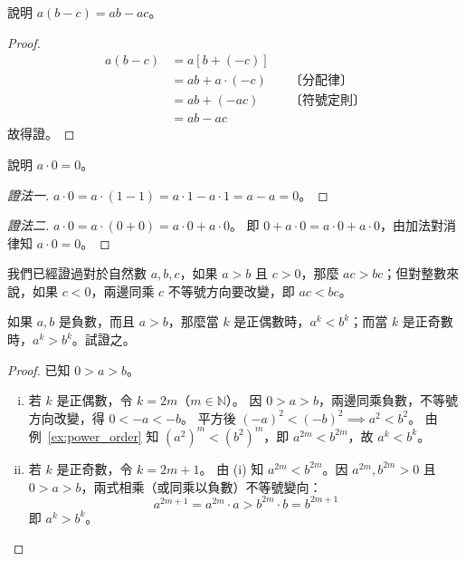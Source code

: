 \begin{example}\label{ex:distrib_minus}
說明 $a(b-c) = ab - ac$。
\end{example}

\begin{proof}
\begin{align*}
  a(b-c) &= a[b + (-c)] \\
  &= ab + a \cdot (-c) && \text{〔分配律〕} \\
  &= ab + (-ac) && \text{〔符號定則〕} \\
  &= ab - ac
\end{align*}
故得證。
\end{proof}

\begin{example}\label{ex:mul_zero_proof}
說明 $a \cdot 0 = 0$。
\end{example}

\begin{proof}[證法一]
$a \cdot 0 = a \cdot (1 - 1) = a \cdot 1 - a \cdot 1 = a - a = 0$。
\end{proof}

\begin{proof}[證法二]
$a \cdot 0 = a \cdot (0 + 0) = a \cdot 0 + a \cdot 0$。
即 $0 + a \cdot 0 = a \cdot 0 + a \cdot 0$，由加法對消律知 $a \cdot 0 = 0$。
\end{proof}

我們已經證過對於自然數 $a, b, c$，如果 $a > b$ 且 $c > 0$，那麼 $ac > bc$；但對整數來說，如果 $c < 0$，兩邊同乘 $c$ 不等號方向要改變，即 $ac < bc$。

\begin{example}\label{ex:neg_power_order}
如果 $a, b$ 是負數，而且 $a > b$，那麼當 $k$ 是正偶數時，$a^k < b^k$；而當 $k$ 是正奇數時，$a^k > b^k$。試證之。
\end{example}

\begin{proof}
已知 $0 > a > b$。
\begin{enumerate}[(i)]
  \item 若 $k$ 是正偶數，令 $k = 2m$（$m \in \mathbb{N}$）。
  因 $0 > a > b$，兩邊同乘負數，不等號方向改變，得 $0 < -a < -b$。
  平方後 $(-a)^2 < (-b)^2 \implies a^2 < b^2$。
  由例~\ref{ex:power_order} 知 $(a^2)^m < (b^2)^m$，即 $a^{2m} < b^{2m}$，故 $a^k < b^k$。
  \item 若 $k$ 是正奇數，令 $k = 2m+1$。
  由 (i) 知 $a^{2m} < b^{2m}$。因 $a^{2m}, b^{2m} > 0$ 且 $0 > a > b$，兩式相乘（或同乘以負數）不等號變向：
  \begin{equation*}
    a^{2m+1} = a^{2m} \cdot a > b^{2m} \cdot b = b^{2m+1}
  \end{equation*}
  即 $a^k > b^k$。
\end{enumerate}
\end{proof}

